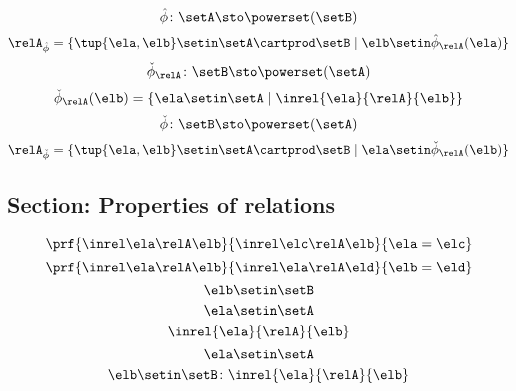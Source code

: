 \begin{forslides}
\begin{equation}
\hat \phi \colon \setA \sto \powerset (\setB)
\end{equation}
 \begin{equation}\label{eq:slides_session2_rel_121}
\relA_{\hat \phi} = \{ \tup{\ela, \elb} \setin \setA \cartprod \setB \mid \elb \setin \hat \phi_{\relA}(\ela)   \}
\end{equation}
\begin{equation}\label{eq:slides_session2_rel_122}
\check \phi_{\relA} \colon \setB \sto \powerset (\setA)
\end{equation}
 \begin{equation}\label{eq:slides_session2_rel_123}
\check \phi_{\relA} (\elb) = \{ \ela \setin \setA \mid \inrel{\ela}{\relA}{\elb}\}
\end{equation}
\begin{equation}\label{eq:slides_session2_rel_124}
\check \phi \colon \setB \sto \powerset (\setA)
\end{equation}
 \begin{equation}\label{eq:slides_session2_rel_125}
 \relA_{\check \phi} = \{ \tup{\ela, \elb} \setin \setA \cartprod \setB \mid \ela \setin \check \phi_{\relA}(\elb)\}
\end{equation}

\subsection{Section: Properties of relations}


\begin{equation}\label{eq:slides_session2_rel_126}
\prf{
                      \inrel \ela \relA \elb
                  }{
                      \inrel \elc \relA \elb
                  }{
                      \ela=\elc
                  }
\end{equation}
 \begin{equation}\label{eq:slides_session2_rel_127}
 \prf{
                      \inrel \ela \relA \elb
                  }{
                      \inrel \ela \relA \eld
                  }{
                      \elb = \eld
                  }
\end{equation}
\begin{equation}\label{eq:slides_session2_rel_128}
\elb\setin \setB
\end{equation}
 \begin{equation}\label{eq:slides_session2_rel_129}
\ela\setin \setA
\end{equation}
\begin{equation}\label{eq:slides_session2_rel_130}
\inrel{\ela}{\relA}{\elb}
\end{equation}
 \begin{equation}\label{eq:slides_session2_rel_131}
\ela\setin \setA
\end{equation}
\begin{equation}\label{eq:slides_session2_rel_132}
\elb \setin \setB\colon \inrel{\ela}{\relA}{\elb}
\end{equation}


\end{forslides}
